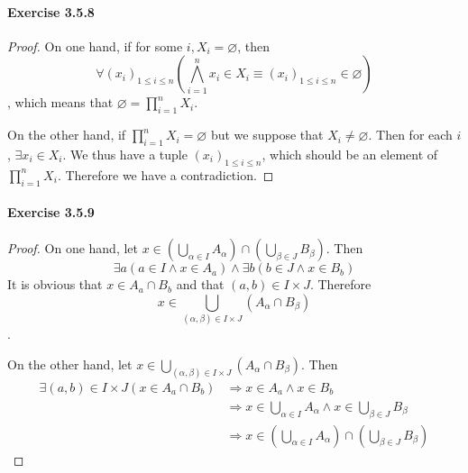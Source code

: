\paragraph{Exercise 3.5.8} \label{exercise3.5.8}
\begin{proof}
On one hand, if for some $i, X_i = \varnothing$, then 
\[
\forall (x_i)_{1\leq i \leq n}(\bigwedge^{n}_{i =1}x_i \in X_i \equiv (x_i)_{1\leq i \leq n} \in 
\varnothing)
\], 
which means that $\varnothing = \prod_{i=1}^{n}X_i$.

On the other hand, if $\prod_{i=1}^{n}X_i = \varnothing$ but we suppose that $X_i \neq \varnothing$. Then 
for each $i$, $\exists x_i \in X_i$. We thus have a tuple $(x_i)_{1\leq i \leq n}$, which should be an 
element of $\prod_{i=1}^{n}X_i$. Therefore we have a contradiction.
\end{proof}

\paragraph{Exercise 3.5.9} \label{exercise3.5.9}
\begin{proof}
On one hand, let $x \in (\bigcup_{\alpha \in I}A_{\alpha})\cap(\bigcup_{\beta \in J}B_{\beta})$. Then 
\[
\exists a(a \in I \wedge x \in A_a) \wedge \exists b(b \in J \wedge x \in B_b)
\]
It is obvious that $x \in A_a \cap B_b$ and that $(a,b) \in I \times J$. Therefore 
\[
x \in \bigcup_{(\alpha,\beta) \in I \times J}(A_\alpha \cap B_\beta)
\].

On the other hand, let $x \in \bigcup_{(\alpha,\beta) \in I \times J}(A_\alpha \cap B_\beta)$. Then 
\begin{align*}
\exists (a,b) \in I \times J(x \in A_a \cap B_b) 
&\Longrightarrow  x \in A_a \wedge x \in B_b \\
&\Longrightarrow x \in \bigcup_{\alpha \in I}A_{\alpha} \wedge x \in \bigcup_{\beta \in J}B_{\beta} \\
&\Longrightarrow x \in (\bigcup_{\alpha \in I}A_{\alpha})\cap(\bigcup_{\beta \in J}B_{\beta})
\end{align*}
\end{proof}

